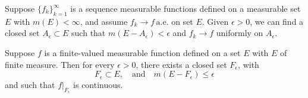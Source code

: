 \documentclass{ctexbook}
\begin{document}
\begin{thm}[Egorov]
    Suppose $\{f_k\}_{k=1}^\infty$ is a sequence measurable functions defined on a measurable set $E$ with $m(E) < \infty$, and
    assume $f_k \rightarrow f \, \text{a.e.}$ on set $E$. Given $\epsilon > 0$, we can find a closed set $A_\epsilon \subset E$
    such that $m(E-A_\epsilon) < \epsilon$ and $f_k \rightarrow f$ uniformly on $A_\epsilon$.
\end{thm}

\begin{thm}[Lusin]
    Suppose $f$ is a finite-valued measurable function defined on a set $E$ with $E$ of finite measure. Then for every $\epsilon > 0$,
    there exists a closed set $F_\epsilon$, with \[F_\epsilon \subset E, \quad \text{and} \quad m(E-F_\epsilon) \leq \epsilon\]
    and such that $f|_{F_\epsilon}$ is continuous. 
\end{thm}
\end{document}
